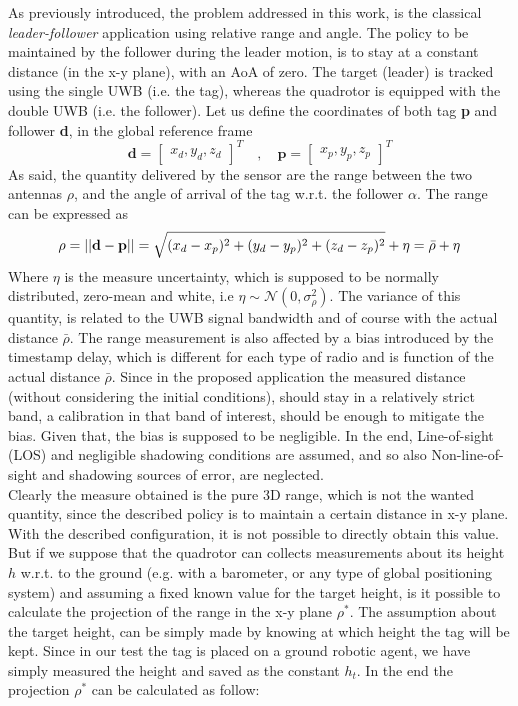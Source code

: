 As previously introduced, the problem addressed in this work, is the classical \textit{leader-follower} application using relative range and angle. The policy to be maintained by the follower during the leader motion, is to stay at a constant distance (in the x-y plane), with an AoA of zero. The target (leader) is tracked using the single UWB (i.e. the tag), whereas the quadrotor is equipped with the double UWB (i.e. the follower). Let us define the coordinates of both tag \textbf{p} and follower \textbf{d}, in the global reference frame
\begin{equation}
\textbf{d} = \begin{bmatrix} x_d,y_d,z_d\end{bmatrix}^T \quad , \quad \textbf{p} = \begin{bmatrix} x_p,y_p,z_p\end{bmatrix}^T
\end{equation}
As said, the quantity delivered by the sensor are the range between the two antennas \textbf{$\rho$}, and the angle of arrival of the tag w.r.t. the follower \textbf{$\alpha$}. The range can be expressed as
\begin{equation}
    \rho = ||\mathbf{d} - \mathbf{p}||=\sqrt{(x_d - x_p)^2 + (y_d - y_p)^2 + (z_d - z_p)^2} + \eta = \Bar{\rho} + \eta
\end{equation}
Where $\eta$ is the measure uncertainty, which is supposed to be normally distributed, zero-mean and white, i.e $\eta \sim \mathcal{N}(0,\sigma_{\rho}^2)$. The variance of this quantity, is related to the UWB signal bandwidth and of course with the actual distance $\bar{\rho}$\cite{uwb_variance}. The range measurement is also affected by a bias introduced by the timestamp delay, which is different for each type of radio and is function of the actual distance $\bar{\rho}$\cite{UWBEvaluationOP}. Since in the proposed application the measured distance (without considering the initial conditions), should stay in a relatively strict band, a calibration in that band of interest, should be enough to mitigate the bias. Given that, the bias is supposed to be negligible. In the end, Line-of-sight (LOS) and negligible shadowing conditions are assumed, and so also Non-line-of-sight and shadowing sources of error\cite{UWBHumshadowing}, are neglected.\\
Clearly the measure obtained is the pure 3D range, which is not the wanted quantity, since the described policy is to maintain a certain distance in x-y plane. With the described configuration, it is not possible to directly obtain this value. But if we suppose that the quadrotor can collects measurements about its height $h$ w.r.t. to the ground (e.g. with a barometer, or any type of global positioning system) and assuming a fixed known value for the target height, is it possible to calculate the projection of the range in the x-y plane $\rho^*$. The assumption about the target height, can be simply made by knowing at which height the tag will be kept. Since in our test the tag is placed on a ground robotic agent, we have simply measured the height and saved as the constant $h_t$. In the end the projection $\rho^*$ can be calculated as follow:

